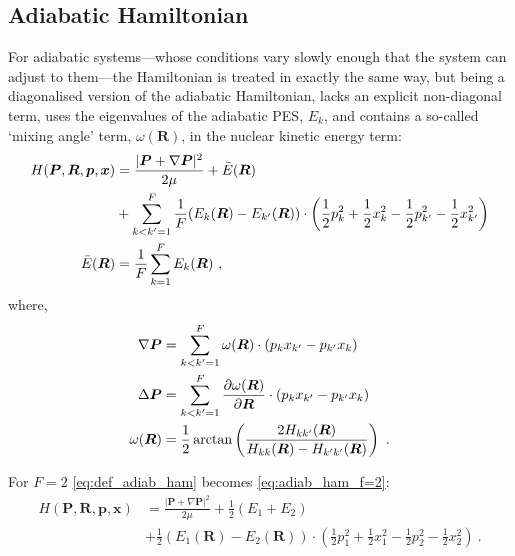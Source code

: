 \subsection{Adiabatic Hamiltonian}\label{s:adh}
%
For adiabatic systems---whose conditions vary slowly enough that the system can adjust to them---the Hamiltonian is treated in exactly the same way, but being a diagonalised version of the adiabatic Hamiltonian, lacks an explicit non-diagonal term, uses the eigenvalues of the adiabatic PES, $ E_{k} $, and contains a so-called `mixing angle' term, $ \omega(\bm{R}) $, in the nuclear kinetic energy term:
\begin{subequations}\label{eq:def_adiab_ham}
\begin{align}
H(\bm{P}, \bm{R}, \bm{p}, \bm{x}) &= 
\frac{|\bm{P}+\nabla\bm{P}|^{2}}{2\mu}+\bar{E}(\bm{R})\\
& +\sum\limits_{k<k'=1}^{F}
\frac{1}{F} (E_{k}(\bm{R})-E_{k'}(\bm{R}))\cdot\left(
\frac{1}{2}p_{k}^{2}+\frac{1}{2}x_{k}^{2}-\frac{1}{2}p_{k'}^{2}-\frac{1}{2}x_{k'}^{2}\right)\nonumber\\
\bar{E}(\bm{R}) &= \frac{1}{F}\sum\limits_{k=1}^{F}E_{k}(\bm{R})~,
\end{align}
\end{subequations}
where,
\begin{subequations}
\begin{align}
\nabla\bm{P} &= \sum\limits_{k<k'=1}^{F} 
\omega(\bm{R})\cdot(p_{k}x_{k'}-p_{k'}x_{k})\\
\Delta \bm{P} &= \sum\limits_{k<k'=1}^{F} 
\frac{\partial \omega(\bm{R})}{\partial \bm{R}}\cdot(p_{k}x_{k'}-p_{k'}x_{k})\\
\omega(\bm{R}) &= 
\frac{1}{2}\arctan\left(\frac{2H_{kk'}(\bm{R})}{H_{kk}(\bm{R})-H_{k'k'}(\bm{R})}\right)~.
\end{align}
\end{subequations}

For $ F = 2 $ \cref{eq:def_adiab_ham} becomes \cref{eq:adiab_ham_f=2}:
\begin{align}\label{eq:adiab_ham_f=2}
H(\bm{P}, \bm{R}, \bm{p}, \bm{x}) &= 
\frac{|\bm{P}+\nabla\bm{P}|^{2}}{2\mu}+\frac{1}{2}(E_{1}+E_{2})\\
& +\frac{1}{2} (E_{1}(\bm{R})-E_{2}(\bm{R}))\cdot\left(
\frac{1}{2}p_{1}^{2}+\frac{1}{2}x_{1}^{2}-\frac{1}{2}p_{2}^{2}-\frac{1}{2}x_{2}^{2}\right)~.\nonumber
\end{align}
%
